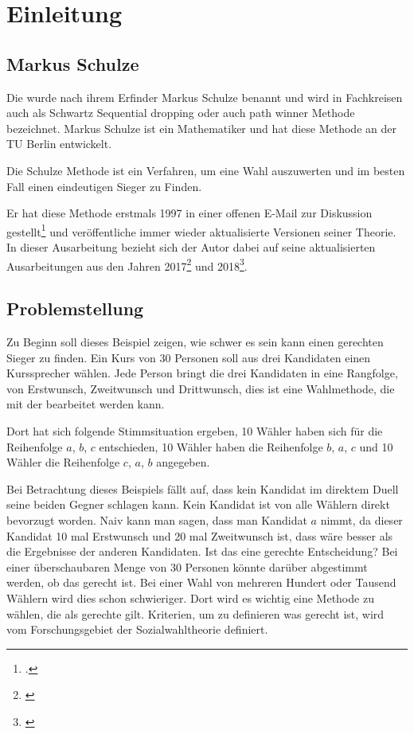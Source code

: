 \section{Einleitung}
\label{sec:Einleitung}


\subsection{Markus Schulze} 
\label{sec:markusSchulze}
Die \schulze wurde nach ihrem Erfinder Markus Schulze benannt und wird in Fachkreisen auch als \glqq Schwartz Sequential dropping\grqq{} oder auch \glqq path winner\grqq{} Methode bezeichnet. Markus Schulze ist ein Mathematiker und hat diese Methode an der TU Berlin entwickelt.

Die Schulze Methode ist ein Verfahren, um eine Wahl auszuwerten und im besten Fall einen eindeutigen Sieger zu Finden.

Er hat diese Methode erstmals 1997 in einer offenen E-Mail zur Diskussion gestellt\footnote{\Vgl \citet{Schulze1997}.} und veröffentliche immer wieder aktualisierte Versionen seiner Theorie. In dieser Ausarbeitung bezieht sich der Autor dabei auf seine aktualisierten Ausarbeitungen aus den Jahren 2017\footnote{\Vgl \citet{Schulze2017}} und 2018\footnote{\Vgl \citet{Schulze2018}}.

\subsection{Problemstellung} 
\label{sec:problemstellungBeispiel}
Zu Beginn soll dieses Beispiel zeigen, wie schwer es sein kann einen gerechten Sieger zu finden. Ein Kurs von 30 Personen soll aus drei Kandidaten einen Kurssprecher wählen. Jede Person bringt die drei Kandidaten in eine Rangfolge, von Erstwunsch, Zweitwunsch und Drittwunsch, dies ist eine Wahlmethode, die mit der \schulze bearbeitet werden kann. 

Dort hat sich folgende Stimmsituation ergeben, 10 Wähler  haben sich für die Reihenfolge $a$, $b$, $c$ entschieden, 10 Wähler haben die Reihenfolge $b$, $a$, $c$ und 10 Wähler die Reihenfolge $c$, $a$, $b$ angegeben.

Bei Betrachtung dieses Beispiels fällt auf, dass kein Kandidat im direktem Duell seine beiden Gegner schlagen kann. Kein Kandidat ist von alle Wählern direkt bevorzugt worden. Naiv kann man sagen, dass man Kandidat $a$ nimmt, da dieser Kandidat 10 mal Erstwunsch und 20 mal Zweitwunsch ist, dass wäre besser als die Ergebnisse der anderen Kandidaten. Ist das eine gerechte Entscheidung? Bei einer überschaubaren Menge von 30 Personen könnte darüber abgestimmt werden, ob das gerecht ist. Bei einer Wahl von mehreren Hundert oder Tausend Wählern wird dies schon schwieriger. Dort wird es wichtig eine Methode zu wählen, die als \glqq gerechte\grqq{} gilt.
Kriterien, um zu definieren was gerecht ist, wird vom Forschungsgebiet der Sozialwahltheorie definiert.

